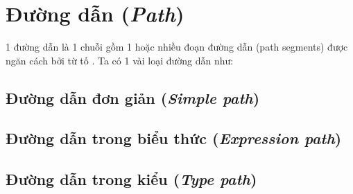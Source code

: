 \section{Đường dẫn (\textit{Path})}

1 đường dẫn là 1 chuỗi gồm 1 hoặc nhiều đoạn đường dẫn (path segments) được ngăn cách bởi từ tố \kw{::}. Ta có 1 vài loại đường dẫn như:

\subsection{Đường dẫn đơn giản (\textit{Simple path})}

\regexsimplepath

\subsection{Đường dẫn trong biểu thức (\textit{Expression path})}

\regexpathinexpr

\subsection{Đường dẫn trong kiểu (\textit{Type path})}

\regexpathintype
